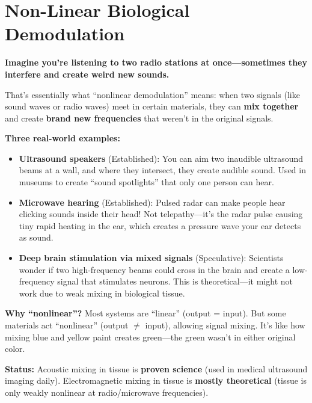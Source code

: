 \chapter{Non-Linear Biological Demodulation}
\label{ch:nonlinear-bio-demod}

\begin{nontechnical}
\textbf{Imagine you're listening to two radio stations at once---sometimes they interfere and create weird new sounds.}

That's essentially what ``nonlinear demodulation'' means: when two signals (like sound waves or radio waves) meet in certain materials, they can \textbf{mix together} and create \textbf{brand new frequencies} that weren't in the original signals.

\textbf{Three real-world examples:}
\begin{itemize}
\item \textbf{Ultrasound speakers} (Established): You can aim two inaudible ultrasound beams at a wall, and where they intersect, they create audible sound. Used in museums to create ``sound spotlights'' that only one person can hear.

\item \textbf{Microwave hearing} (Established): Pulsed radar can make people hear clicking sounds inside their head! Not telepathy---it's the radar pulse causing tiny rapid heating in the ear, which creates a pressure wave your ear detects as sound.

\item \textbf{Deep brain stimulation via mixed signals} (Speculative): Scientists wonder if two high-frequency beams could cross in the brain and create a low-frequency signal that stimulates neurons. This is theoretical---it might not work due to weak mixing in biological tissue.
\end{itemize}

\textbf{Why ``nonlinear''?} Most systems are ``linear'' (output = input). But some materials act ``nonlinear'' (output $\neq$ input), allowing signal mixing. It's like how mixing blue and yellow paint creates green---the green wasn't in either original color.

\textbf{Status:} Acoustic mixing in tissue is \textbf{proven science} (used in medical ultrasound imaging daily). Electromagnetic mixing in tissue is \textbf{mostly theoretical} (tissue is only weakly nonlinear at radio/microwave frequencies).
\end{nontechnical}


